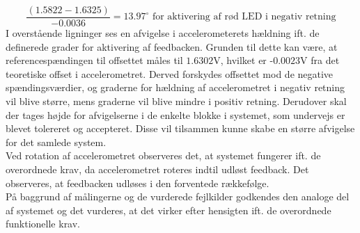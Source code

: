 \begin{equation}\label{eq:graderLED_1}
\dfrac{(1.5822 - 1.6325)}{-0.0036} = 13.97^{\circ}\text{ for aktivering af rød LED i negativ retning}
\end{equation}
\noindent I overstående ligninger ses en afvigelse i accelerometerets hældning ift. de definerede grader for aktivering af feedbacken. Grunden til dette kan være, at referencespændingen til offsettet måles til $1.6302$V, hvilket er -$0.0023$V fra det teoretiske offset i accelerometret. Derved forskydes offsettet mod de negative spændingsværdier, og graderne for hældning af accelerometret i negativ retning vil blive større, mens graderne vil blive mindre i positiv retning. Derudover skal der tages højde for afvigelserne i de enkelte blokke i systemet, som undervejs er blevet tolereret og accepteret. Disse vil tilsammen kunne skabe en større afvigelse for det samlede system. \\
Ved rotation af accelerometret observeres det, at systemet fungerer ift. de overordnede krav, da accelerometret roteres indtil udløst feedback. Det observeres, at feedbacken udløses i den forventede rækkefølge.\\
På baggrund af målingerne og de vurderede fejlkilder godkendes den analoge del af systemet og det vurderes, at det virker efter hensigten ift. de overordnede funktionelle krav.\\

